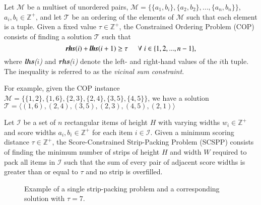 \documentclass{elsarticle}
\begin{document}
\begin{definition}
	Let $\mathcal{M}$ be a multiset of unordered pairs, $\mathcal{M} = \{\{a_1, b_i\}, \{a_2, b_2\},..., \{a_n, b_n\}\}$, $a_i, b_i \in \mathbb{Z}^+$, and let $\mathcal{T}$ be an ordering of the elements of $\mathcal{M}$ such that each element is a tuple. Given a fixed value $\tau \in \mathbb{Z}^+$, the Constrained Ordering Problem (COP) consists of finding a solution $\mathcal{T}$ such that
	\begin{equation}
		\label{eqn:vsc}
		\emph{\textbf{rhs}}(i) + \emph{\textbf{lhs}}(i+1) \geq \tau \hspace{5mm} \forall \hspace{1mm} i \in \{1,2,..., n-1\},
	\end{equation}
	where \emph{\textbf{lhs}($i$)} and \emph{\textbf{rhs}($i$)} denote the left- and right-hand values of the $i$th tuple. The inequality is referred to as the \emph{vicinal sum constraint}.
\end{definition}

For example, given the COP instance $\mathcal{M} = \{\{1,2\}, \{1,6\}, \{2,3\}, \{2,4\}, \{3,5\}, \{4,5\}\}$, we have a solution $\mathcal{T} = \langle(1,6), (2,4), (3,5), (2,3), (4,5), (2,1)\rangle$

\begin{definition}
	Let $\mathcal{I}$ be a set of $n$ rectangular items of height $H$ with varying widths $w_i \in \mathbb{Z}^+$ and score widths $a_i, b_i \in \mathbb{Z}^+$ for each item $i \in \mathcal{I}$. Given a minimum scoring distance $\tau \in \mathbb{Z}^+$, the Score-Constrained Strip-Packing Problem (SCSPP) consists of finding the minimum number of strips of height $H$ and width $W$ required to pack all items in $\mathcal{I}$ such that the sum of every pair of adjacent score widths is greater than or equal to $\tau$ and no strip is overfilled.
\end{definition}

\begin{figure}	
	\centering
	\begin{subfigure}[h]{0.35\textwidth}
		
		\label{fig:items}
	\end{subfigure} 
	\begin{subfigure}[h]{0.65\textwidth}
		
		\label{fig:itemsaligned}
	\end{subfigure}
	\caption{Example of a single strip-packing problem and a corresponding solution with $\tau = 7$.}
	\label{fig:items/aligned}
\end{figure}
\end{document}
